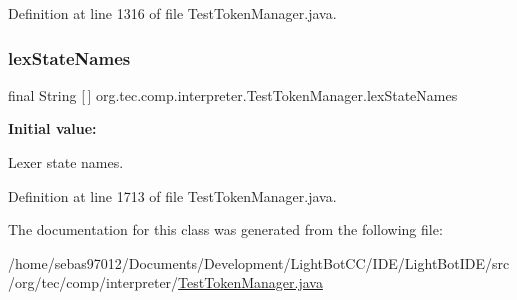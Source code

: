 Definition at line 1316 of file Test\+Token\+Manager.\+java.

\mbox{\label{classorg_1_1tec_1_1comp_1_1interpreter_1_1_test_token_manager_a9bc8225846c73fbb7d7e0b9af407eb9c}} 
\subsubsection{\texorpdfstring{lex\+State\+Names}{lexStateNames}}
{\footnotesize\ttfamily final String \mbox{[}$\,$\mbox{]} org.\+tec.\+comp.\+interpreter.\+Test\+Token\+Manager.\+lex\+State\+Names\hspace{0.3cm}{\ttfamily [static]}}

{\bfseries Initial value\+:}
\begin{DoxyCode}{0}
\DoxyCodeLine{= \{}
\DoxyCodeLine{   \textcolor{stringliteral}{"DEFAULT"},}
\DoxyCodeLine{\}}
\end{DoxyCode}
Lexer state names. 

Definition at line 1713 of file Test\+Token\+Manager.\+java.



The documentation for this class was generated from the following file\+:\begin{DoxyCompactItemize}
\item 
/home/sebas97012/\+Documents/\+Development/\+Light\+Bot\+C\+C/\+I\+D\+E/\+Light\+Bot\+I\+D\+E/src/org/tec/comp/interpreter/\mbox{\hyperlink{_test_token_manager_8java}{Test\+Token\+Manager.\+java}}\end{DoxyCompactItemize}
